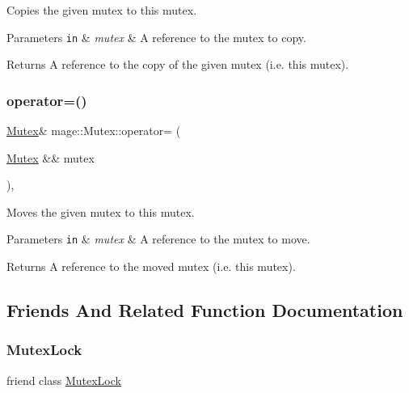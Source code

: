 Copies the given mutex to this mutex.


\begin{DoxyParams}[1]{Parameters}
\mbox{\tt in}  & {\em mutex} & A reference to the mutex to copy. \\
\hline
\end{DoxyParams}
\begin{DoxyReturn}{Returns}
A reference to the copy of the given mutex (i.\+e. this mutex). 
\end{DoxyReturn}
\hypertarget{classmage_1_1_mutex_a35e4c26ec9fd69bad0ce2465ee5132fd}{}\label{classmage_1_1_mutex_a35e4c26ec9fd69bad0ce2465ee5132fd} 
\subsubsection{\texorpdfstring{operator=()}{operator=()}\hspace{0.1cm}{\footnotesize\ttfamily [2/2]}}
{\footnotesize\ttfamily \hyperlink{classmage_1_1_mutex}{Mutex}\& mage\+::\+Mutex\+::operator= (\begin{DoxyParamCaption}\item[{\hyperlink{classmage_1_1_mutex}{Mutex} \&\&}]{mutex }\end{DoxyParamCaption})\hspace{0.3cm}{\ttfamily [default]}, {\ttfamily [noexcept]}}

Moves the given mutex to this mutex.


\begin{DoxyParams}[1]{Parameters}
\mbox{\tt in}  & {\em mutex} & A reference to the mutex to move. \\
\hline
\end{DoxyParams}
\begin{DoxyReturn}{Returns}
A reference to the moved mutex (i.\+e. this mutex). 
\end{DoxyReturn}


\subsection{Friends And Related Function Documentation}
\hypertarget{classmage_1_1_mutex_a7177018259362468923e579d8525b5d5}{}\label{classmage_1_1_mutex_a7177018259362468923e579d8525b5d5} 
\subsubsection{\texorpdfstring{Mutex\+Lock}{MutexLock}}
{\footnotesize\ttfamily friend class \hyperlink{classmage_1_1_mutex_lock}{Mutex\+Lock}\hspace{0.3cm}{\ttfamily [friend]}}



